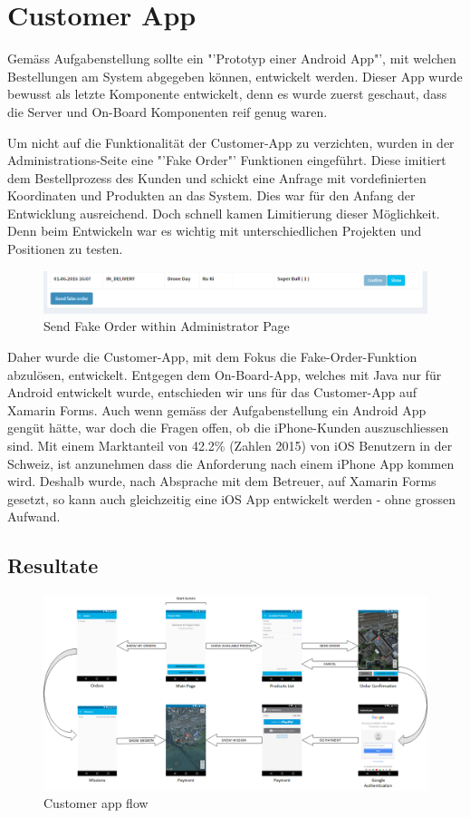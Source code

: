 \section{Customer App}
Gemäss Aufgabenstellung sollte ein "'Prototyp einer Android App"', mit welchen Bestellungen am System abgegeben können, entwickelt werden.
Dieser App wurde bewusst als letzte Komponente entwickelt, denn es wurde zuerst geschaut, dass die Server und On-Board Komponenten reif genug waren.

Um nicht auf die Funktionalität der Customer-App zu verzichten, wurden in der Administrations-Seite eine "'Fake Order"' Funktionen eingeführt. 
Diese imitiert dem Bestellprozess des Kunden und schickt eine Anfrage mit vordefinierten Koordinaten und Produkten an das System.
Dies war für den Anfang der Entwicklung ausreichend.
Doch schnell kamen Limitierung dieser Möglichkeit.
Denn beim Entwickeln war es wichtig mit unterschiedlichen Projekten und Positionen zu testen.
\begin{figure}[h]
	\centering
	\includegraphics[width=1\textwidth] {images/customer-app-fake-order.png}
	\caption{Send Fake Order within Administrator Page}
\end{figure}
Daher wurde die Customer-App, mit dem Fokus die Fake-Order-Funktion abzulösen, entwickelt.
Entgegen dem On-Board-App, welches mit Java nur für Android entwickelt wurde, entschieden wir uns für das Customer-App auf Xamarin Forms.
Auch wenn gemäss der Aufgabenstellung ein Android App gengüt hätte, war doch die Fragen offen, ob die iPhone-Kunden auszuschliessen sind.
Mit einem Marktanteil von 42.2\% (Zahlen 2015) \cite{ios-user} von iOS Benutzern in der Schweiz, ist anzunehmen dass die Anforderung nach einem iPhone App kommen wird.
Deshalb wurde, nach Absprache mit dem Betreuer, auf Xamarin Forms gesetzt, so kann auch gleichzeitig eine iOS App entwickelt werden - ohne grossen Aufwand.

\subsection{Resultate}
\begin{landscape}
\begin{figure}[h]
	\centering
	\includegraphics[width=0.8\paperheight] {images/customer-app-pages.png}
	\caption{Customer app flow}
\end{figure}
\end{landscape}

